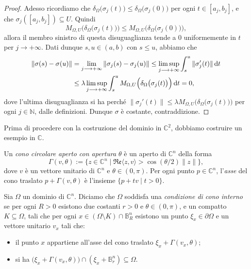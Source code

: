 \begin{proof}
    Adesso ricordiamo che $\delta_\Omega\big(\sigma_j(t)\big)\le\delta_\Omega\big(\sigma_j(0)\big)$ per ogni $t\in[a_j,b_j]$, e che $\sigma_j([a_j,b_j])\subseteq U$. Quindi
    $$M_{\Omega,U}\Big(\delta_\Omega\big(\sigma_j(t)\big)\Big) \le M_{\Omega,U}\Big(\delta_\Omega\big(\sigma_j(0)\big)\Big),$$
    allora il membro sinistro di questa disuguaglianza tende a $0$ uniformemente in $t$ per $j\longrightarrow+\infty$. Dati dunque $s,u\in(a,b)$ con $s\le u$, abbiamo che
    \begin{align*}
        \|\sigma(s)-\sigma(u)\|&=\lim_{j\longrightarrow+\infty}\|\sigma_j(s)-\sigma_j(u)\| \le \limsup_{j\longrightarrow+\infty}\int_s^u\|\sigma_j'(t)\|\mathop{}\!\mathrm{d} t \\
        &\le \lambda\limsup_{j\longrightarrow+\infty}\int_s^uM_{\Omega,U}\Big(\delta_\Omega\big(\sigma_j(t)\big)\Big)\mathop{}\!\mathrm{d} t=0,
    \end{align*}
    dove l'ultima disuguaglianza si ha perché $\|\sigma_j'(t)\|\le\lambda M_{\Omega,U}\Big(\delta_\Omega\big(\sigma_j(t)\big)\Big)$ per ogni $j\in\mathbb{N}$, dalle definizioni. Dunque $\sigma$ è costante, contraddizione.
\end{proof}

Prima di procedere con la costruzione del dominio in $\mathbb{C}^2$, dobbiamo costruire un esempio in $\mathbb{C}$.

\begin{defn}
    Un \textit{cono circolare aperto con apertura $\theta$} è un aperto di $\mathbb{C}^n$ della forma
    $$\Gamma(v,\theta):=\{z\in\mathbb{C}^n\mid \mathfrak{Re}\langle z,v\rangle>\cos(\theta/2)\|z\|\},$$
    dove $v$ è un vettore unitario di $\mathbb{C}^n$ e $\theta\in(0,\pi)$. Per ogni punto $p\in\mathbb{C}^n$, l'\textit{asse} del cono traslato $p+\Gamma(v,\theta)$ è l'insieme $\{p+tv\mid t>0\}$.
\end{defn}

\begin{defn}
    Sia $\Omega$ un dominio di $\mathbb{C}^n$. Diciamo che $\Omega$ soddisfa una \textit{condizione di cono interno} se per ogni $R>0$ esistono due costanti $r>0$ e $\theta\in(0,\pi)$, e un compatto $K\subseteq\Omega$, tali che per ogni $x\in(\Omega\setminus K)\cap\mathbb{B}^n_R$ esistono un punto $\xi_x\in\partial\Omega$ e un vettore unitario $v_x$ tali che:
    \begin{itemize}
        \item il punto $x$ appartiene all'asse del cono traslato $\xi_x+\Gamma(v_x,\theta)$;
        \item si ha $\big(\xi_x+\Gamma(v_x,\theta)\big)\cap (\xi_x+\mathbb{B}^n_r)\subseteq\Omega$.
    \end{itemize}
\end{defn}

